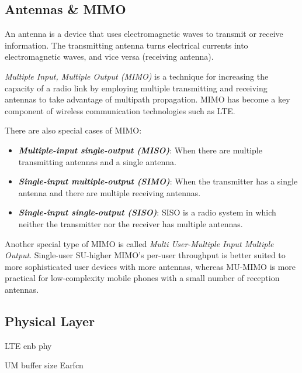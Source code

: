 \subsection{Antennas \& MIMO}

An antenna is a device that uses electromagnetic waves to transmit or receive information.
The transmitting antenna turns electrical currents into electromagnetic waves, 
and vice versa (receiving antenna).

\textit{Multiple Input, Multiple Output (MIMO)} is a technique for increasing the capacity 
of a radio link by employing multiple transmitting and receiving antennas to take advantage
of multipath propagation. MIMO has become a key component of wireless communication technologies 
such as LTE.

There are also special cases of MIMO:
\begin{itemize}[topsep=0pt]
  \item \textbf{\textit{Multiple-input single-output (MISO)}}: When there are multiple transmitting antennas and a single antenna.
  \item \textbf{\textit{Single-input multiple-output (SIMO)}}: When the transmitter has a single antenna and there are multiple receiving antennas.
  \item \textbf{\textit{Single-input single-output (SISO)}}: SISO is a radio system in which neither the transmitter nor the receiver has multiple antennas.
\end{itemize}

Another special type of MIMO is called \textit{Multi User-Multiple Input Multiple Output}.
Single-user SU-higher MIMO's per-user throughput is better suited to more sophisticated user devices with more antennas, 
whereas MU-MIMO is more practical for low-complexity mobile phones with a small number of reception antennas.

\subsection{Physical Layer}

LTE enb phy

UM buffer size
Earfcn

